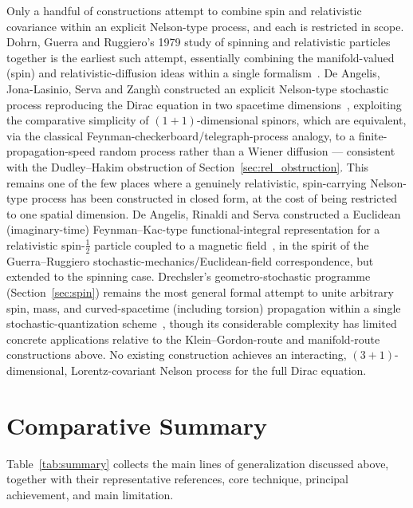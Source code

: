 \documentclass[11pt]{article}
\begin{document}
Only a handful of constructions attempt to combine spin and relativistic
covariance within an explicit Nelson-type process, and each is restricted in
scope. Dohrn, Guerra and Ruggiero's 1979 study of spinning and relativistic
particles together is the earliest such attempt, essentially combining the
manifold-valued (spin) and relativistic-diffusion ideas within a single
formalism~\cite{dohrnguerraruggiero79}. De Angelis, Jona-Lasinio, Serva and
Zangh\`{\i} constructed an explicit Nelson-type stochastic process reproducing
the Dirac equation in two spacetime dimensions~\cite{deangelisjls86},
exploiting the comparative simplicity of $(1{+}1)$-dimensional spinors, which
are equivalent, via the classical Feynman-checkerboard/telegraph-process
analogy, to a finite-propagation-speed random process rather than a Wiener
diffusion --- consistent with the Dudley--Hakim obstruction of
Section~\ref{sec:rel_obstruction}. This remains one of the few places where 
a genuinely relativistic, spin-carrying Nelson-type process has been constructed
in closed form, at the cost of being restricted to one spatial dimension. De
Angelis, Rinaldi and Serva constructed a Euclidean (imaginary-time)
Feynman--Kac-type functional-integral representation for a relativistic
spin-$\tfrac12$ particle coupled to a magnetic
field~\cite{deangelisrinaldiserva91}, in the spirit of the Guerra--Ruggiero
stochastic-mechanics/Euclidean-field correspondence, but extended to the
spinning case. Drechsler's geometro-stochastic programme
(Section~\ref{sec:spin}) remains the most general formal attempt to unite
arbitrary spin, mass, and curved-spacetime (including torsion) propagation
within a single stochastic-quantization scheme~\cite{drechsler96}, though its
considerable complexity has limited concrete applications relative to the
Klein--Gordon-route and manifold-route constructions above. No existing
construction achieves an interacting, $(3{+}1)$-dimensional, 
Lorentz-covariant Nelson process for the full Dirac equation.

\section{Comparative Summary}\label{sec:summary}

Table~\ref{tab:summary} collects the main lines of generalization discussed above, together with their representative references, core technique, principal achievement, and main limitation.
\end{document}
